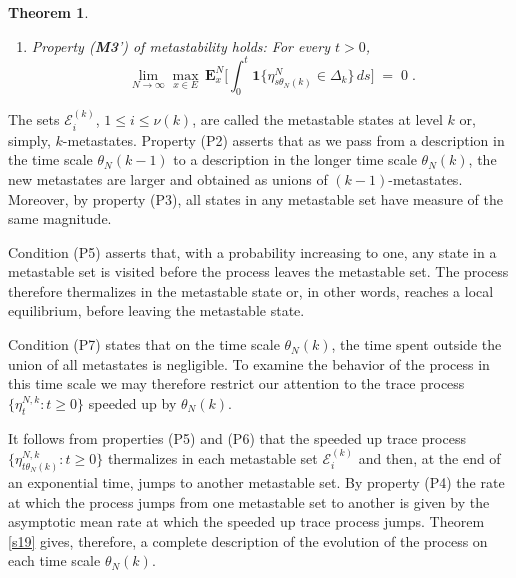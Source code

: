 \documentclass[reqno]{amsart}
\newtheorem{theorem}{Theorem}[section]
\begin{document}
\begin{theorem}
\begin{enumerate}
\item Property {\rm ({\bf M3}')} of metastability holds: For every
  $t>0$,
\begin{equation*}
\lim_{N\to \infty} \max_{x\in E} \, {{\mathbf E}}^N_x \Big[
\int_0^t {{\mathbf 1}}\{ \eta^N_{s\theta_N(k)} \in \Delta_k\} \, ds  \Big] \;=\; 0\;. 
\end{equation*}

\end{enumerate}
\end{theorem}

The sets ${{\mathcal E}}^{(k)}_i$, $1\le i\le \nu(k)$, are called the
metastable states at level $k$ or, simply, $k$-metastates. Property
(P2) asserts that as we pass from a description in the time scale
$\theta_N(k-1)$ to a description in the longer time scale
$\theta_N(k)$, the new metastates are larger and obtained as unions of
$(k-1)$-metastates. Moreover, by property (P3), all states in any
metastable set have measure of the same magnitude.

Condition (P5) asserts that, with a probability increasing to one, any
state in a metastable set is visited before the process leaves the
metastable set. The process therefore thermalizes in the metastable
state or, in other words, reaches a local equilibrium, before leaving
the metastable state.

Condition (P7) states that on the time scale $\theta_N(k)$, the time
spent outside the union of all metastates is negligible. To examine
the behavior of the process in this time scale we may therefore
restrict our attention to the trace process $\{\eta^{N,k}_t : t\ge
0\}$ speeded up by $\theta_N(k)$. 

It follows from properties (P5) and (P6) that the speeded up trace
process $\{\eta^{N,k}_{t\theta_N(k)} : t\ge 0\}$ thermalizes in each
metastable set ${{\mathcal E}}^{(k)}_i$ and then, at the end of an exponential
time, jumps to another metastable set. By property (P4) the rate at
which the process jumps from one metastable set to another is given by
the asymptotic mean rate at which the speeded up trace process
jumps. Theorem \ref{s19} gives, therefore, a complete description of
the evolution of the process on each time scale $\theta_N(k)$.
\end{document}
